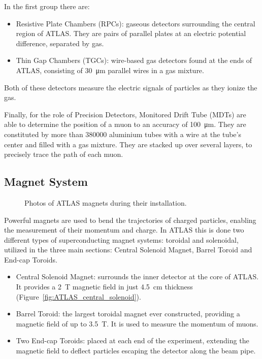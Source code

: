In the first group there are: 
\begin{itemize}
    \item Resistive Plate Chambers (RPCs): gaseous detectors surrounding the central region of ATLAS. They are pairs of parallel plates at an electric potential difference, separated by gas.
    \item Thin Gap Chambers (TGCs): wire-based gas detectors found at the ends of ATLAS, consisting of \qty{30}{\micro\meter} parallel wires in a gas mixture.
\end{itemize}
Both of these detectors measure the electric signals of particles as they ionize the gas.

Finally, for the role of Precision Detectors, Monitored Drift Tube (MDTs) are able to determine the position of a muon to an accuracy of \qty{100}{\micro\meter}. They are constituted by more than \num{380000} aluminium tubes with a wire at the tube's center and filled with a gas mixture. They are stacked up over several layers, to precisely trace the path of each muon.


\subsection{Magnet System}\label{sec:magnet_system}

\begin{figure}[h!tbpt]
    \centering
    \hfill
    \centering
    \caption{Photos of ATLAS magnets during their installation.}
\end{figure}

Powerful magnets are used to bend the trajectories of charged particles, enabling the measurement of their momentum and charge. In ATLAS this is done two different types of superconducting magnet systems: toroidal and solenoidal, utilized in the three main sections: Central Solenoid Magnet, Barrel Toroid and End-cap Toroids.
\begin{itemize}
    \item Central Solenoid Magnet: surrounds the inner detector at the core of ATLAS. It provides a \qty{2}{\tesla} magnetic field in just \qty{4.5}{\centi\meter} thickness (Figure~\ref{fig:ATLAS_central_solenoid}).
    \item Barrel Toroid: the largest toroidal magnet ever constructed, providing a magnetic field of up to \qty{3.5}{\tesla}. It is used to measure the momentum of muons.
    \item Two End-cap Toroids: placed at each end of the experiment, extending the magnetic field to deflect particles escaping the detector along the beam pipe.
\end{itemize}

